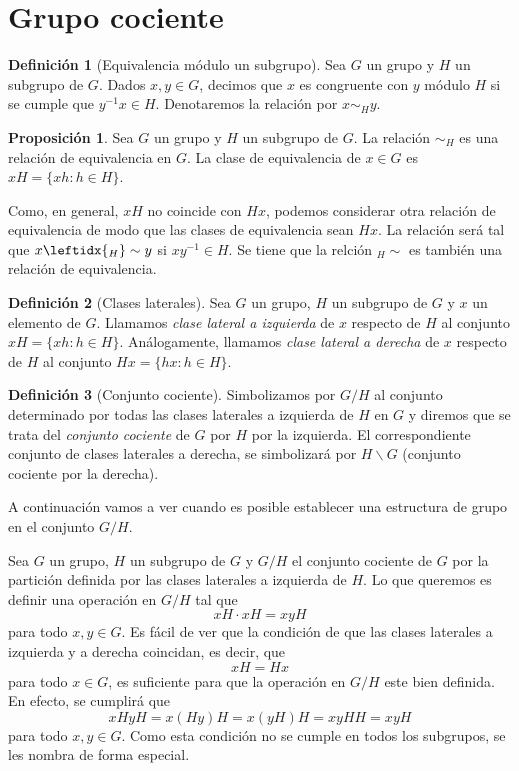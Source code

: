 \documentclass[12pt]{book}
\theoremstyle{definition}
\newtheorem{defi}{Definición}[section]
\newtheorem{prop}{Proposición}[section]
\begin{document}
\section{Grupo cociente}

\begin{defi}[Equivalencia módulo un subgrupo]
Sea $G$ un grupo y $H$ un subgrupo de $G$. Dados $x,y\in G$, decimos que $x$ es congruente con $y$ módulo $H$ si se cumple que $y^{-1}x\in H$. Denotaremos la relación por $x\sim_H y$.
\end{defi}



\begin{prop}
Sea $G$ un grupo y $H$ un subgrupo de $G$. La relación $\sim_H$ es una relación de equivalencia en $G$. La clase de equivalencia de $x\in G$ es $xH=\{xh:h\in H\}$.
\end{prop}

Como, en general, $xH$ no coincide con $Hx$, podemos considerar otra relación de equivalencia de modo que las clases de equivalencia sean $Hx$. La relación será tal que $x\leftidx{_H}\sim y$ si $xy^{-1}\in H$. Se tiene que la relción $_H\sim$ es también una relación de equivalencia.

\begin{defi}[Clases laterales]
Sea $G$ un grupo, $H$ un subgrupo de $G$ y $x$ un elemento de $G$. Llamamos \textit{clase lateral a izquierda} de $x$ respecto de $H$ al conjunto $xH=\{xh:h\in H\}$. Análogamente, llamamos \textit{clase lateral a derecha} de $x$ respecto de $H$ al conjunto $Hx=\{hx:h\in H\}$.
\end{defi}

\begin{defi}[Conjunto cociente]
Simbolizamos por $G/H$ al conjunto determinado por todas las clases laterales a izquierda de $H$ en $G$ y diremos que se trata del \textit{conjunto cociente} de $G$ por $H$ por la izquierda. El correspondiente conjunto de clases laterales a derecha, se simbolizará por $H\backslash G$ (conjunto cociente por la derecha).
\end{defi}

A continuación vamos a ver cuando es posible establecer una estructura de grupo en el conjunto $G/H$.

Sea $G$ un grupo, $H$ un subgrupo de $G$ y $G/H$ el conjunto cociente de $G$ por la partición definida por las clases laterales a izquierda de $H$. Lo que queremos es definir una operación en $G/H$ tal que
$$xH\cdot xH=xyH$$
para todo $x,y\in G$. Es fácil de ver que la condición de que las clases laterales a izquierda y a derecha coincidan, es decir, que
$$xH=Hx$$
para todo $x\in G$, es suficiente para que la operación en $G/H$ este bien definida. En efecto, se cumplirá que
$$xHyH=x(Hy)H=x(yH)H=xyHH=xyH$$
para todo $x,y\in G$. Como esta condición no se cumple en todos los subgrupos, se les nombra de forma especial.
\end{document}
